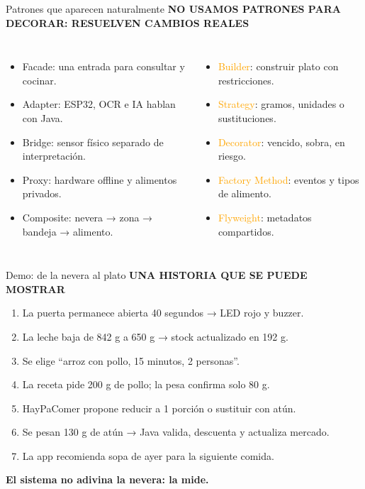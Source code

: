 \documentclass[aspectratio=169,11pt]{beamer}
\newcommand{\tagline}[1]{{\color{mint}\footnotesize\bfseries #1}}
\begin{document}
\begin{frame}{Patrones que aparecen naturalmente}
\tagline{NO USAMOS PATRONES PARA DECORAR: RESUELVEN CAMBIOS REALES}
\begin{columns}[T,onlytextwidth]
\begin{itemize}
\item \textcolor{mint}{Facade}: una entrada para consultar y cocinar.
\item \textcolor{mint}{Adapter}: ESP32, OCR e IA hablan con Java.
\item \textcolor{mint}{Bridge}: sensor físico separado de interpretación.
\item \textcolor{mint}{Proxy}: hardware offline y alimentos privados.
\item \textcolor{mint}{Composite}: nevera → zona → bandeja → alimento.
\end{itemize}
\begin{itemize}
\item \textcolor{orange}{Builder}: construir plato con restricciones.
\item \textcolor{orange}{Strategy}: gramos, unidades o sustituciones.
\item \textcolor{orange}{Decorator}: vencido, sobra, en riesgo.
\item \textcolor{orange}{Factory Method}: eventos y tipos de alimento.
\item \textcolor{orange}{Flyweight}: metadatos compartidos.
\end{itemize}
\end{columns}
\end{frame}

\begin{frame}{Demo: de la nevera al plato}
\tagline{UNA HISTORIA QUE SE PUEDE MOSTRAR}
\begin{enumerate}
\item La puerta permanece abierta 40 segundos → LED rojo y buzzer.
\item La leche baja de 842 g a 650 g → stock actualizado en 192 g.
\item Se elige ``arroz con pollo, 15 minutos, 2 personas''.
\item La receta pide 200 g de pollo; la pesa confirma solo 80 g.
\item HayPaComer propone reducir a 1 porción o sustituir con atún.
\item Se pesan 130 g de atún → Java valida, descuenta y actualiza mercado.
\item La app recomienda sopa de ayer para la siguiente comida.
\end{enumerate}
\vfill
\begin{center}{\color{mint}\Large\bfseries El sistema no adivina la nevera: la mide.}\end{center}
\end{frame}
\end{document}
